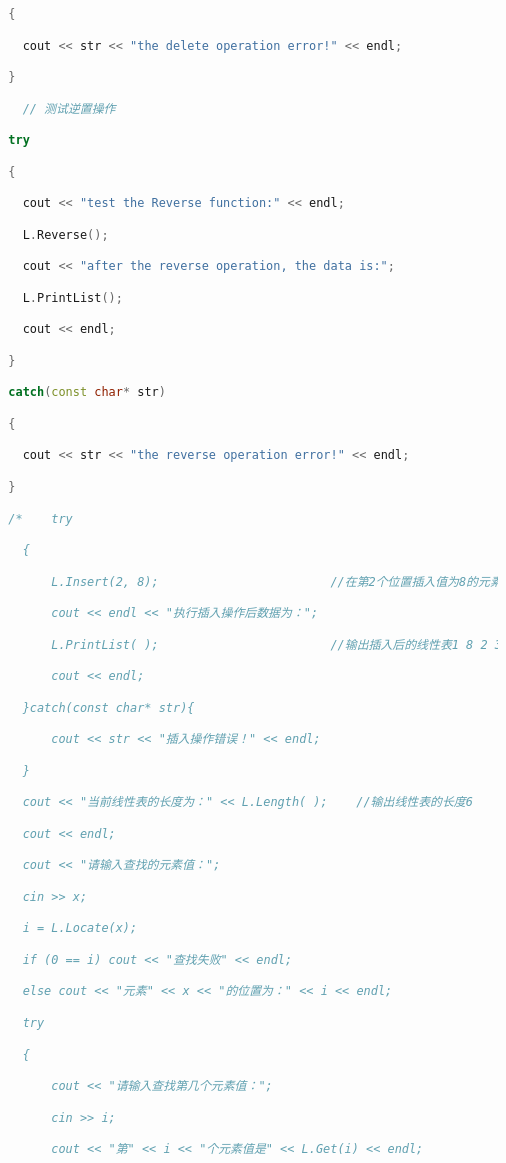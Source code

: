 \begin{lstlisting}[language=C++]
  {

    cout << str << "the delete operation error!" << endl;

  }

    // 测试逆置操作

  try

  {

    cout << "test the Reverse function:" << endl;

    L.Reverse();

    cout << "after the reverse operation, the data is:";

    L.PrintList();

    cout << endl;

  }

  catch(const char* str)

  {

    cout << str << "the reverse operation error!" << endl;

  }

  /*    try

    {

        L.Insert(2, 8);                        //在第2个位置插入值为8的元素

        cout << endl << "执行插入操作后数据为：";

        L.PrintList( );                        //输出插入后的线性表1 8 2 3 4 5

        cout << endl;

    }catch(const char* str){

        cout << str << "插入操作错误！" << endl;

    }

    cout << "当前线性表的长度为：" << L.Length( );    //输出线性表的长度6

    cout << endl;

    cout << "请输入查找的元素值：";

    cin >> x;

    i = L.Locate(x);

    if (0 == i) cout << "查找失败" << endl;

    else cout << "元素" << x << "的位置为：" << i << endl;          

    try

    {

        cout << "请输入查找第几个元素值：";

        cin >> i;

        cout << "第" << i << "个元素值是" << L.Get(i) << endl;


\end{lstlisting}
